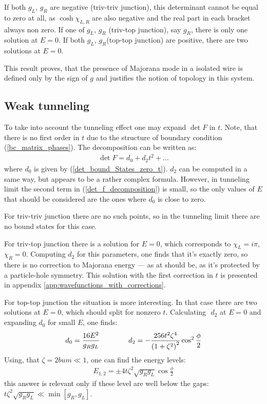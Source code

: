 If both $ g_L $, $ g_R $ are negative (triv-triv junction), this determinant cannot be equal to zero at all, as $ \cosh \chi_{L,R} $ are also negative and the real part in each bracket always non zero.  If one of $ g_L $, $ g_R $ (triv-top junction), say $ g_R $,	 there is only one solution at $ E=0 $. If both $ g_L $, $ g_R $(top-top junction) are positive, there are two solutions at $ E=0 $.

This result proves, that the presence of Majorana mode in a isolated wire is defined only by the sign of $ g $ and justifies the notion of  topology in this system.

\subsection{Weak tunneling}
\label{subsect: weak_tunneling}

To take into account the tunneling effect one may expand $ \det F $ in $ t $. Note, that there is no first order in $ t $ due to the structure of boundary condition (\ref{bc_matrix_phases}). The decomposition can be written as:
\begin{gather}
\label{det_f_decomposition}
	\det F
	=
	d_0
	+
	d_2t^2
	+
	\dots
\end{gather}
where $ d_0 $ is given by (\ref{det_bound_States_zero_t}). $ d_2 $ can be computed in a same way, but appears to be  a rather complex formula.  However, in tunneling limit the second term in (\ref{det_f_decomposition}) is small, so the only values of $ E $ that should be considered are the ones where $ d_0 $ is close to zero.

For triv-triv junction there are no such points, so in the tunneling limit there are no bound states for this case.

For triv-top junction there is a solution for $ E=0 $, which corresponds to $ \chi_L=i \pi $, $ \chi_R=0 $. Computing $ d_2 $ for this parameters, one finds that it's exactly zero, so there is no correction to Majorana energy --- as at should be, as it's protected by a particle-hole symmetry. This solution with the first correction in $ t $ is presented in appendix \ref{app:wavefunctions_with_corrections}.

For top-top junction the situation is more interesting. In that case there are two solutions at $ E=0 $, which should split for nonzero $ t $. Calculating $  $ $ d_2 $ at $ E=0 $ and expanding $ d_0 $ for small $ E $, one finds:
\begin{gather}
d_0=\frac{16E^2}{g_Rg_L}
\qquad\qquad
	d_2 = -\frac{256t^2\zeta^4}{\left(1+\zeta^2\right)^2}\cos^2\frac{\phi}{2}
\end{gather}
Using, that $ \zeta=2bum\ll1 $, one can find the energy levels:
\begin{gather}
	E_{1,2}
	=
	\pm
	4t\zeta^2\sqrt{g_Rg_L}\cos\frac{\phi}{2}
\end{gather}
this answer is relevant only if these level are well below the gaps: $ t\zeta^2\sqrt{g_Rg_L}\ll\min\left[g_R,g_L\right] $.
